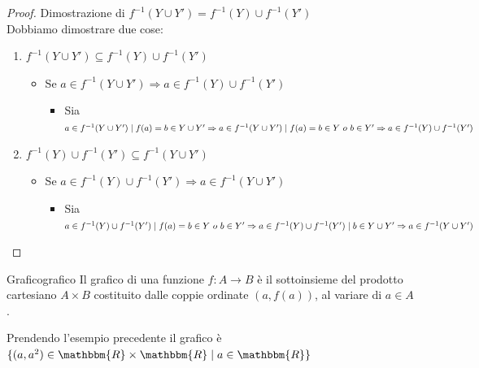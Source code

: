 \documentclass[12pt, letterpaper]{report}
\newcounter{definition}
\newcommand{\nmu}{}
\begin{document}
	\begin{proof}{Dimostrazione di $f^{-1}(Y \cup Y') {=} f^{-1}(Y) \cup f^{-1}(Y')$ } \quad \\
		Dobbiamo dimostrare due cose:
		\begin{enumerate}
			\item $f^{-1}(Y \cup Y') \subseteq f^{-1}(Y) \cup f^{-1}(Y')$
			\begin{itemize}
				\item Se $a \in f^{-1}(Y \cup Y') \Rightarrow a \in f^{-1}(Y) \cup f^{-1}(Y')$
				\begin{itemize}
					\item Sia $a \in f^{-1}(Y \cup Y') \mid f(a) = b \in Y \cup Y' \\ \Rightarrow a \in f^{-1}(Y \cup Y') \mid f(a) = b \in Y \ o \ b \in Y' \\ \Rightarrow a \in f^{-1}(Y) \cup f^{-1}(Y')$
				\end{itemize}
			\end{itemize}
			\item $f^{-1}(Y) \cup f^{-1}(Y') \subseteq f^{-1}(Y \cup Y')$
			\begin{itemize}
				\item Se $a \in f^{-1}(Y) \cup f^{-1}(Y') \Rightarrow a \in f^{-1}(Y \cup Y')$
				\begin{itemize}
					\item Sia $a \in f^{-1}(Y) \cup f^{-1}(Y') \mid f(a) = b \in Y \ o \ b \in Y' \\ \Rightarrow a \in f^{-1}(Y) \cup f^{-1}(Y') \mid b \in Y \cup Y' \\ \Rightarrow a \in f^{-1}(Y \cup Y')$
				\end{itemize}
			\end{itemize}
		\end{enumerate}
	\end{proof}

	\begin{definition}{\nmu Grafico}{grafico}
		Il grafico  di una funzione $f: A \to B$ è il sottoinsieme del prodotto cartesiano $A \times B$ costituito dalle coppie ordinate $(a, f(a))$, al variare di $a \in A$.
	\end{definition}
	Prendendo l'esempio precedente il grafico è $\{(a, a^2) \in \mathbbm{R} \times \mathbbm{R} \mid a \in \mathbbm{R}\}$
\end{document}
